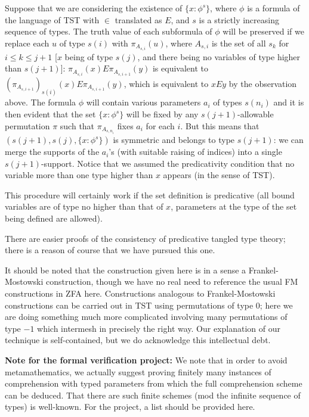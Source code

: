 \documentclass[112pt]{article}
\begin{document}
Suppose that we are considering the existence of $\{x : \phi^s\}$, where $\phi$ is a formula of the language of TST with $\in$ translated as $E$, and $s$ is a strictly increasing sequence of types.  The truth value of each subformula of $\phi$ will be preserved if we replace each $u$ of type $s(i)$ with $\pi_{A_{s,i}}(u)$, where  $A_{s,i}$ is the set of all $s_k$ for $i \leq k \leq j+1$ [$x$ being of type $s(j)$, and there being no variables of type higher than $s(j+1)$]:  $\pi_{A_{s,i}}(x) E  \pi_{A_{s,i+1}}(y)$ is equivalent to $(\pi_{A_{s,i+1}})_{s(i)}(x) E \pi_{A_{s,i+1}}(y)$, which is equivalent to $xEy$ by the observation above. The formula $\phi$ will contain various parameters $a_i$ of types $s(n_i)$ and it is then evident that the set $\{x : \phi^s\}$ will be fixed by any $s(j+1)$-allowable permutation $\pi$ such that $\pi_{A_{s,n_i}}$ fixes $a_i$ for each $i$.  But this means that
$(s(j+1),s(j),\{x : \phi^s\})$ is symmetric and belongs to type $s(j+1)$:  we can merge the supports of the $a_i$'s (with suitable raising of indices) into a single $s(j+1)$-support.  Notice that we assumed the predicativity condition that no variable more than one type higher than $x$ appears (in the sense of TST).

This procedure will certainly work if the set definition is predicative (all bound variables are of type no higher than that of $x$, parameters at the type
of the set being defined are allowed).

There are easier proofs of the consistency of predicative tangled type theory;  there is a reason of course that we have pursued this one.

It should be noted that the construction given here is in a sense a Frankel-Mostowski construction, though we have no real need to reference the usual
FM constructions in ZFA here.  Constructions analogous to Frankel-Mostowski constructions can be carried out in TST using permutations of type 0;  here we are doing something much more complicated involving many permutations of type $-1$ which intermesh in precisely the right way.  Our explanation of our technique is self-contained, but we do acknowledge this intellectual debt.

{\bf Note for the formal verification project:}  We note that in order to avoid metamathematics, we actually suggest proving finitely many instances of comprehension with typed parameters from which the full comprehension scheme can be deduced.  That there are such finite schemes (mod the infinite sequence of types) is well-known.  For the project, a list should be provided here.
\end{document}
